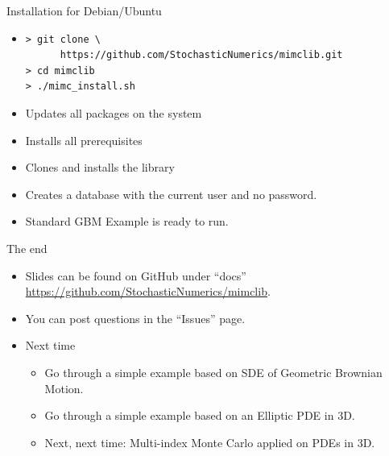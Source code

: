 \begin{frame}[fragile]{Installation for Debian/Ubuntu}
\begin{itemize}
  \item
\begin{verbatim}
> git clone \
      https://github.com/StochasticNumerics/mimclib.git
> cd mimclib
> ./mimc_install.sh
\end{verbatim}
  \item Updates all packages on the system
  \item Installs all prerequisites
  \item Clones and installs the library
  \item Creates a database with the current user and no password.
  \item Standard GBM Example is ready to run.
\end{itemize}
\end{frame}

\begin{frame}{The end}
  \begin{itemize}
  \item Slides can be found on GitHub under {``docs''}
    \url{https://github.com/StochasticNumerics/mimclib}.
    \item You can post questions in the ``Issues'' page.
  \item Next time
    \begin{itemize}
    \item Go through a simple example based on SDE of Geometric
      Brownian Motion.
    \item Go through a simple example based on an Elliptic PDE in
      3D.
    \item Next, next time: Multi-index Monte Carlo applied on PDEs in
      3D.
    \end{itemize}
  \end{itemize}

\end{frame}



